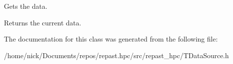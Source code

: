 Gets the data. 

\begin{DoxyReturn}{Returns}
the current data. 
\end{DoxyReturn}


The documentation for this class was generated from the following file\-:\begin{DoxyCompactItemize}
\item 
/home/nick/\-Documents/repos/repast.\-hpc/src/repast\-\_\-hpc/T\-Data\-Source.\-h\end{DoxyCompactItemize}
